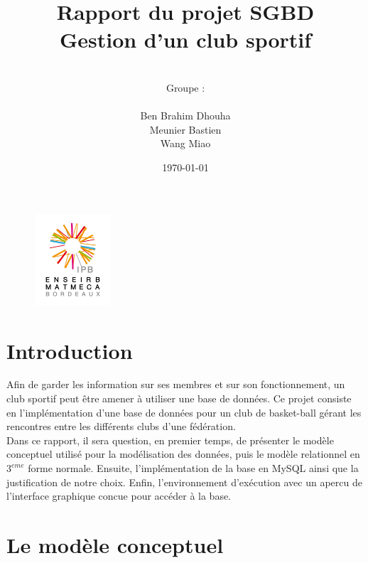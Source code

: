 \documentclass{article}
\date{\vspace{3 cm} \today}
\author{\vspace{4 cm} \\ Groupe :\\ \\Ben Brahim Dhouha\\Meunier Bastien\\Wang Miao }
\title{Rapport du projet SGBD \\ Gestion d'un club sportif}
\begin{document}
\newenvironment{narrow}[2]{%
\begin{list}{}{%
\setlength{\topsep}{0pt}%
\setlength{\leftmargin}{#1}%
\setlength{\rightmargin}{#2}%
\setlength{\listparindent}{\parindent}%
\setlength{\itemindent}{\parindent}%
\setlength{\parsep}{\parskip}%
}%
\item[]}{\end{list}}


\thispagestyle{empty}
\begin{figure}
\includegraphics[width=0.25\textwidth]{enseirb-matmeca.jpg}
\end{figure}
\maketitle

\newpage


\section*{Introduction}


Afin de garder les information sur ses membres et sur son fonctionnement, un club sportif peut être amener à utiliser une base de données. Ce projet consiste en l'implémentation d'une base de données pour un club de basket-ball gérant les rencontres entre les différents clubs d'une fédération. \\

Dans ce rapport, il sera question, en premier temps, de présenter le modèle conceptuel utilisé pour la modélisation des données, puis le modèle relationnel en $3^{eme}$ forme normale. Ensuite, l'implémentation de la base en MySQL ainsi que la justification de notre choix. Enfin, l'environnement d'exécution avec un apercu de l'interface graphique concue pour accéder à la base. 


\newpage
\tableofcontents

\newpage
\section{Le modèle conceptuel}
\end{document}
